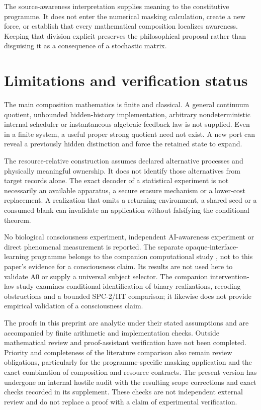 The source-awareness interpretation supplies meaning to the constitutive programme. It does not enter the numerical masking calculation, create a new force, or establish that every mathematical composition localizes awareness. Keeping that division explicit preserves the philosophical proposal rather than disguising it as a consequence of a stochastic matrix.



\section{Limitations and verification status}\label{sec:limits}
The main composition mathematics is finite and classical. A general continuum quotient, unbounded hidden-history implementation, arbitrary nondeterministic internal scheduler or instantaneous algebraic feedback law is not supplied. Even in a finite system, a useful proper strong quotient need not exist. A new port can reveal a previously hidden distinction and force the retained state to expand.

The resource-relative construction assumes declared alternative processes and physically meaningful ownership. It does not identify those alternatives from target records alone. The exact decoder of a statistical experiment is not necessarily an available apparatus, a secure erasure mechanism or a lower-cost replacement. A realization that omits a returning environment, a shared seed or a consumed blank can invalidate an application without falsifying the conditional theorem.

No biological consciousness experiment, independent AI-awareness experiment or direct phenomenal measurement is reported. The separate opaque-interface-learning programme belongs to the companion computational study \cite{RodgersLearning2026}, not to this paper's evidence for a consciousness claim. Its results are not used here to validate A0 or supply a universal subject selector. The companion intervention-law study \cite{RodgersIntervention2026} examines conditional identification of binary realizations, recoding obstructions and a bounded SPC-2/IIT comparison; it likewise does not provide empirical validation of a consciousness claim.

The proofs in this preprint are analytic under their stated assumptions and are accompanied by finite arithmetic and implementation checks. Outside mathematical review and proof-assistant verification have not been completed. Priority and completeness of the literature comparison also remain review obligations, particularly for the programme-specific masking application and the exact combination of composition and resource contracts. The present version has undergone an internal hostile audit with the resulting scope corrections and exact checks recorded in its supplement. These checks are not independent external review and do not replace a proof with a claim of experimental verification.

